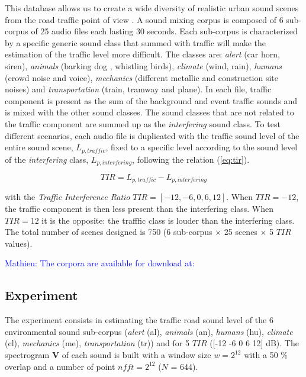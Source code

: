 \documentclass[twocolumn,a4paper,10pt]{article}
\newcommand{\ml}[1]{\textcolor{blue}{ Mathieu: #1}}
\begin{document}
This database allows us to create a wide diversity of realistic urban sound scenes from the road traffic point of view \cite{gloaguen_creation_2017}. A sound mixing corpus is composed of 6 sub-corpus of 25 audio files each lasting 30 seconds. Each sub-corpus is characterized by a specific generic sound class that summed with traffic will make the estimation of the traffic level more difficult. The classes are: \textit{alert} (car horn, siren), \textit{animals} (barking dog , whistling birds), \textit{climate} (wind, rain), \textit{humans} (crowd noise and voice), \textit{mechanics} (different metallic and construction site noises) and \textit{transportation} (train, tramway and plane). In each file, traffic component is present as the sum of the background and event traffic sounds and is mixed with the other sound classes. The sound classes that are not related to the traffic component are summed up as the \textit{interfering} sound class. To test different scenarios, each audio file is duplicated with the traffic sound level of the entire sound scene, $L_{p,traffic}$, fixed to a specific level according to the sound level of the \textit{interfering} class, $L_{p,interfering}$,  following the relation (\ref{eq:tir}).

\begin{equation}\label{eq:tir}
TIR = L_{p,traffic}-L_{p,interfering}
\end{equation}

with the \textit{Traffic Interference Ratio} $TIR = \left[-12, -6, 0, 6, 12\right]$. When $TIR = -12$, the traffic component is then less present than the interfering class. When $TIR = 12$ it is the opposite: the trafffic class is louder than the interfering class. The total number of scenes designed is 750 (6 sub-corpus $\times$ 25 scenes $\times$  5 $TIR$ values).

\ml{The corpora are available for download at: \url{}}

\subsection{Experiment}

The experiment consists in estimating the traffic road sound level of the 6 environmental sound sub-corpus (\textit{alert} (al), \textit{animals} (an), \textit{humans} (hu), \textit{climate} (cl), \textit{mechanics} (me), \textit{transportation} (tr)) and for 5 $TIR$ ([-12 -6 0 6 12] dB). The spectrogram $\mathbf{V}$ of each sound is built with a window size $w = 2^{12}$ with a 50 $\%$ overlap and a number of point $nfft = 2^{12}$ ($N$ = 644).
\end{document}
